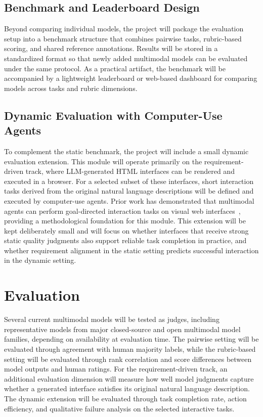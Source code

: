 \documentclass[pdflatex,sn-mathphys-num]{sn-jnl}
\begin{document}
\subsection{Benchmark and Leaderboard Design}

Beyond comparing individual models, the project will package the evaluation setup into
a benchmark structure that combines pairwise tasks, rubric-based scoring, and shared
reference annotations. Results will be stored in a standardized format so that newly
added multimodal models can be evaluated under the same protocol. As a practical
artifact, the benchmark will be accompanied by a lightweight leaderboard or web-based
dashboard for comparing models across tasks and rubric dimensions.

\subsection{Dynamic Evaluation with Computer-Use Agents}

To complement the static benchmark, the project will include a small dynamic evaluation
extension. This module will operate primarily on the requirement-driven track, where
LLM-generated HTML interfaces can be rendered and executed in a browser. For a selected
subset of these interfaces, short interaction tasks derived from the original natural
language descriptions will be defined and executed by computer-use agents. Prior work
has demonstrated that multimodal agents can perform goal-directed interaction tasks on
visual web interfaces~\cite{visualwebarena}, providing a methodological foundation for
this module. This extension will be kept deliberately small and will focus on whether
interfaces that receive strong static quality judgments also support reliable task
completion in practice, and whether requirement alignment in the static setting predicts
successful interaction in the dynamic setting.

\section{Evaluation}\label{sec:evaluation}

Several current multimodal models will be tested as judges, including representative
models from major closed-source and open multimodal model families, depending on
availability at evaluation time. The pairwise setting will be evaluated through
agreement with human majority labels, while the rubric-based setting will be evaluated
through rank correlation and score differences between model outputs and human ratings.
For the requirement-driven track, an additional evaluation dimension will measure how
well model judgments capture whether a generated interface satisfies its original
natural language description. The dynamic extension will be evaluated through task
completion rate, action efficiency, and qualitative failure analysis on the selected
interactive tasks.
\end{document}

